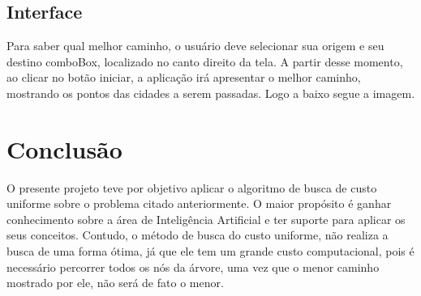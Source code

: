 \documentclass[12pt]{article}
\begin{document}
\subsection{Interface}
Para saber qual melhor caminho, o usuário deve selecionar sua origem e seu destino comboBox, localizado no canto direito da tela. A partir desse momento, ao clicar no botão iniciar, a aplicação irá apresentar o melhor caminho, mostrando os pontos das cidades a serem passadas. Logo a baixo segue a imagem.

\section{Conclusão}
O presente projeto teve por objetivo aplicar o algoritmo de busca de custo uniforme sobre o problema citado anteriormente. O maior propósito é ganhar conhecimento sobre a área de Inteligência Artificial e ter suporte para aplicar os seus conceitos. Contudo, o método de busca do custo uniforme, não realiza a busca de uma forma ótima, já que ele tem um grande custo computacional, pois é necessário percorrer todos os nós da árvore, uma vez que o menor caminho mostrado por ele, não será de fato o menor.
\end{document}
